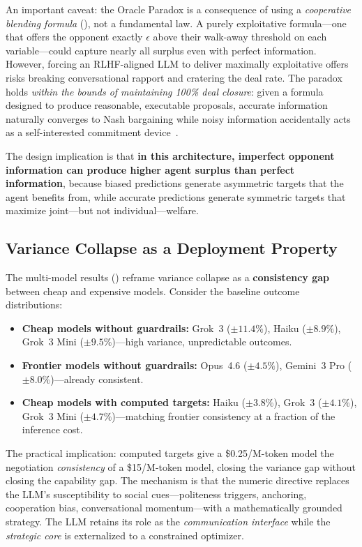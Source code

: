 \documentclass[11pt,a4paper]{article}
\begin{document}
An important caveat: the Oracle Paradox is a consequence of using a \emph{cooperative blending formula} (), not a fundamental law. A purely exploitative formula---one that offers the opponent exactly $\epsilon$ above their walk-away threshold on each variable---could capture nearly all surplus even with perfect information. However, forcing an RLHF-aligned LLM to deliver maximally exploitative offers risks breaking conversational rapport and cratering the deal rate. The paradox holds \emph{within the bounds of maintaining 100\% deal closure}: given a formula designed to produce reasonable, executable proposals, accurate information naturally converges to Nash bargaining while noisy information accidentally acts as a self-interested commitment device~\citep{schelling1960strategy}.

The design implication is that \textbf{in this architecture, imperfect opponent information can produce higher agent surplus than perfect information}, because biased predictions generate asymmetric targets that the agent benefits from, while accurate predictions generate symmetric targets that maximize joint---but not individual---welfare.

\subsection{Variance Collapse as a Deployment Property}
\label{sec:enterprise}

The multi-model results () reframe variance collapse as a \textbf{consistency gap} between cheap and expensive models. Consider the baseline outcome distributions:

\begin{itemize}
\item \textbf{Cheap models without guardrails:} Grok~3 ($\pm 11.4\%$), Haiku ($\pm 8.9\%$), Grok~3 Mini ($\pm 9.5\%$)---high variance, unpredictable outcomes.
\item \textbf{Frontier models without guardrails:} Opus~4.6 ($\pm 4.5\%$), Gemini~3 Pro ($\pm 8.0\%$)---already consistent.
\item \textbf{Cheap models with computed targets:} Haiku ($\pm 3.8\%$), Grok~3 ($\pm 4.1\%$), Grok~3 Mini ($\pm 4.7\%$)---matching frontier consistency at a fraction of the inference cost.
\end{itemize}

The practical implication: computed targets give a \$0.25/M-token model the negotiation \emph{consistency} of a \$15/M-token model, closing the variance gap without closing the capability gap. The mechanism is that the numeric directive replaces the LLM's susceptibility to social cues---politeness triggers, anchoring, cooperation bias, conversational momentum---with a mathematically grounded strategy. The LLM retains its role as the \emph{communication interface} while the \emph{strategic core} is externalized to a constrained optimizer.
\end{document}
